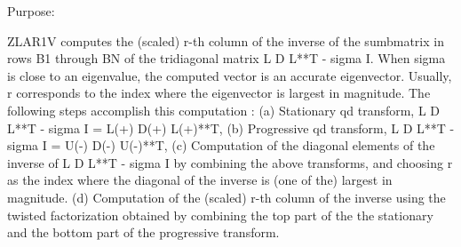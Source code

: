  \begin{DoxyParagraph}{Purpose\+: }
\begin{DoxyVerb} ZLAR1V computes the (scaled) r-th column of the inverse of
 the sumbmatrix in rows B1 through BN of the tridiagonal matrix
 L D L**T - sigma I. When sigma is close to an eigenvalue, the
 computed vector is an accurate eigenvector. Usually, r corresponds
 to the index where the eigenvector is largest in magnitude.
 The following steps accomplish this computation :
 (a) Stationary qd transform,  L D L**T - sigma I = L(+) D(+) L(+)**T,
 (b) Progressive qd transform, L D L**T - sigma I = U(-) D(-) U(-)**T,
 (c) Computation of the diagonal elements of the inverse of
     L D L**T - sigma I by combining the above transforms, and choosing
     r as the index where the diagonal of the inverse is (one of the)
     largest in magnitude.
 (d) Computation of the (scaled) r-th column of the inverse using the
     twisted factorization obtained by combining the top part of the
     the stationary and the bottom part of the progressive transform.\end{DoxyVerb}
 
\end{DoxyParagraph}

